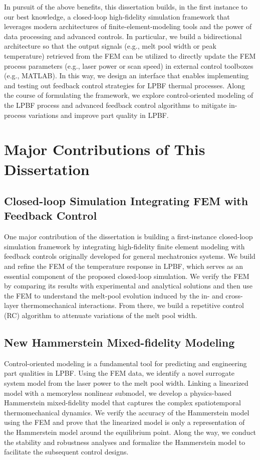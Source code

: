 \documentclass [11pt, proquest] {uwthesis}[2020/02/24]
\begin{document}
In pursuit of the above benefits, this dissertation builds, in the first
instance to our best knowledge, a closed-loop high-fidelity simulation
framework that leverages modern architectures of finite-element-modeling
tools and the power of data processing and advanced controls. In particular,
we build a bidirectional architecture so that the output signals (e.g.,
melt pool width or peak temperature) retrieved from the FEM can be
utilized to directly update the FEM process parameters (e.g., laser
power or scan speed) in external control toolboxes (e.g., MATLAB).
In this way, we design an interface that enables implementing
and testing out feedback control strategies for LPBF thermal processes. Along the course of formulating the framework, we explore control-oriented modeling of the LPBF process and advanced feedback control algorithms to mitigate in-process variations and improve part quality in LPBF.

\section*{Major Contributions of This Dissertation}

\subsection*{Closed-loop Simulation Integrating FEM with Feedback Control}
One major contribution of the dissertation is building a first-instance
closed-loop simulation framework by integrating high-fidelity finite
element modeling with feedback controls originally developed for general
mechatronics systems. We build and refine the FEM of the temperature response in LPBF, which serves as an essential component of the proposed closed-loop simulation. We verify the FEM by comparing its results with experimental
and analytical solutions and then use the FEM to understand the melt-pool
evolution induced by the in- and cross-layer thermomechanical interactions.
From there, we build a repetitive control (RC) algorithm to attenuate variations
of the melt pool width.

\subsection*{New Hammerstein Mixed-fidelity Modeling}
Control-oriented modeling is a fundamental tool
for predicting and engineering part qualities in LPBF. Using
the FEM data, we identify a novel surrogate system model from the
laser power to the melt pool width. Linking a linearized model with
a memoryless nonlinear submodel, we develop a physics-based Hammerstein
mixed-fidelity model that captures the complex spatiotemporal thermomechanical dynamics.
We verify the accuracy of the Hammerstein model using the FEM and
prove that the linearized model is only a representation of the Hammerstein
model around the equilibrium point. Along the way, we conduct the
stability and robustness analyses and formalize the Hammerstein model
to facilitate the subsequent control designs.
\end{document}
